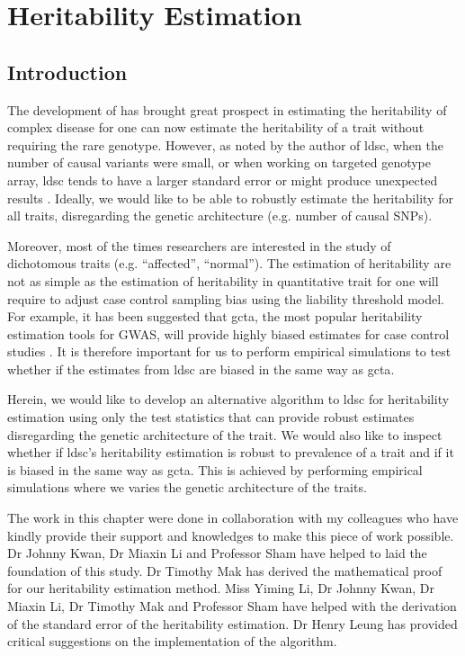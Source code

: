 \chapter{Heritability Estimation}

	\section{Introduction}
	The development of  has brought great prospect in estimating the heritability of complex disease for one can now estimate the heritability of a trait without requiring the rare genotype. 
	However, as noted by the author of \gls{ldsc}, when the number of causal variants were small, or when working on targeted genotype array, \gls{ldsc} tends to have a larger standard error or might produce unexpected results \citep{Bulik-Sullivan2015}.
	Ideally, we would like to be able to robustly estimate the heritability for all traits, disregarding the genetic architecture (e.g. number of causal \glspl{SNP}).
	
	Moreover, most of the times researchers are interested in the study of dichotomous traits (e.g. ``affected'', ``normal'').
	The estimation of heritability are not as simple as the estimation of heritability in quantitative trait for one will require to adjust case control sampling bias using the liability threshold model.
	For example, it has been suggested that \gls{gcta}, the most popular heritability estimation tools for \gls{GWAS}, will provide highly biased estimates for case control studies \citep{Golan2014}.
	It is therefore important for us to perform empirical simulations to test whether if the estimates from \gls{ldsc} are biased in the same way as \gls{gcta}.
	
	Herein, we would like to develop an alternative algorithm to \gls{ldsc} for heritability estimation using only the test statistics that can provide robust estimates disregarding the genetic architecture of the trait.
	We would also like to inspect whether if \gls{ldsc}'s heritability estimation is robust to prevalence of a trait and if it is biased in the same way as \gls{gcta}.
	This is achieved by performing empirical simulations where we varies the genetic architecture of the traits.
	
	The work in this chapter were done in collaboration with my colleagues who have kindly provide their support and knowledges to make this piece of work possible.
	Dr Johnny Kwan, Dr Miaxin Li and Professor Sham have helped to laid the foundation of this study. 
	Dr Timothy Mak has derived the mathematical proof for our heritability estimation method. 
	Miss Yiming Li, Dr Johnny Kwan, Dr Miaxin Li, Dr Timothy Mak and Professor Sham have helped with the derivation of the standard error of the heritability estimation. 
	Dr Henry Leung has provided critical suggestions on the implementation of the algorithm.
	
